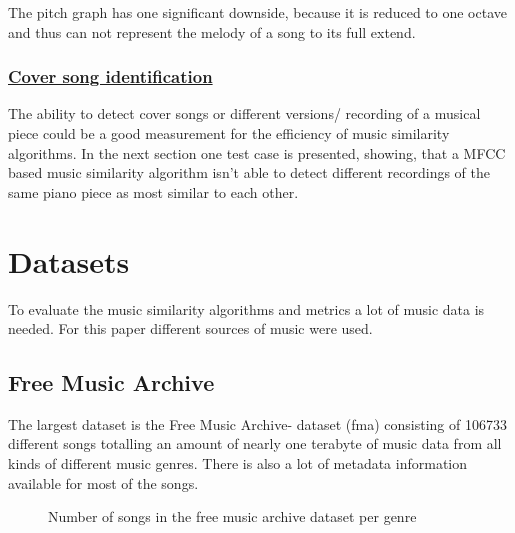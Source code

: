 The pitch graph has one significant downside, because it is reduced to one octave and thus can not represent the melody of a song to its full extend. 

\FloatBarrier

\subsubsection{\underline{Cover song identification}}

The ability to detect cover songs or different versions/ recording of a musical piece could be a good measurement for the efficiency of music similarity algorithms. In the next section one test case is presented, showing, that a MFCC based music similarity algorithm isn't able to detect different recordings of the same piano piece as most similar to each other. 

\section{Datasets}
To evaluate the music similarity algorithms and metrics a lot of music data is needed.
For this paper different sources of music were used. 

\subsection{Free Music Archive}

The largest dataset is the Free Music Archive- dataset (fma) consisting of 106733 different songs totalling an amount of nearly one terabyte of music data from all kinds of different music genres.\cite{fma1} There is also a lot of metadata information available for most of the songs.

\begin{figure}[thpb]
	\centering
	\caption{Number of songs in the free music archive dataset per genre}
	\label{fmadist}
\end{figure}
\FloatBarrier


